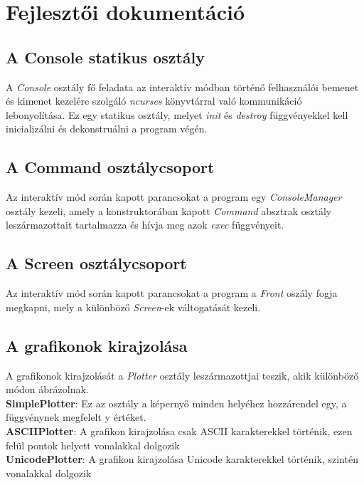 \section{Fejlesztői dokumentáció}

\subsection{A Console statikus osztály}
A \textit{Console} osztály fő feladata az interaktív módban történő felhasználói
bemenet és kimenet kezelére szolgáló \textit{ncurses} könyvtárral való kommunikáció
lebonyolítása. Ez egy statikus osztály, melyet \textit{init} és \textit{destroy}
függvényekkel kell inicializálni és dekonstruálni a program végén.

\begin{center}
\end{center}

\subsection{A Command osztálycsoport}
Az interaktív mód során kapott parancsokat a program egy \textit{ConsoleManager}
osztály kezeli, amely a konstruktorában kapott \textit{Command} absztrak osztály
leszármazottait tartalmazza és hívja meg azok \textit{exec} függvényeit.

\begin{center}
\end{center}

\subsection{A Screen osztálycsoport}
Az interaktív mód során kapott parancsokat a program a \textit{Front} oszály fogja
megkapni, mely a különböző \textit{Screen}-ek váltogatását kezeli.

\begin{center}
\end{center}

\subsection{A grafikonok kirajzolása}
A grafikonok kirajzolását a \textit{Plotter} osztály leszármazottjai teszik,
akik különböző módon ábrázolnak.\\
\textbf{SimplePlotter}: Ez az osztály a képernyő minden helyéhez hozzárendel egy, a függvénynek megfelelt
y értéket.\\
\textbf{ASCIIPlotter}: A grafikon kirajzolása csak ASCII karakterekkel történik,
ezen felül pontok helyett vonalakkal dolgozik\\
\textbf{UnicodePlotter}: A grafikon kirajzolása Unicode karakterekkel történik,
szintén vonalakkal dolgozik\\

